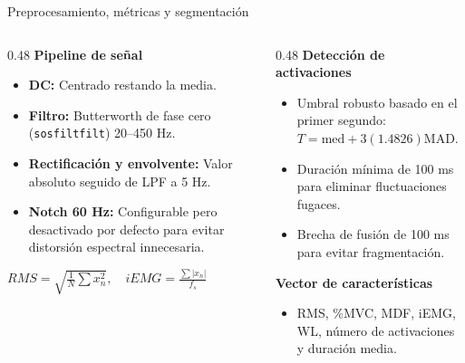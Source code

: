\documentclass[10pt, aspectratio=169]{beamer}
\begin{document}
\begin{frame}{Preprocesamiento, métricas y segmentación}
\fontsize{8.5pt}{10.5pt}\selectfont
\begin{columns}[t]
    \begin{column}{0.48\textwidth}
        \textbf{Pipeline de señal}
        \begin{itemize}
            \item \textbf{DC:} Centrado restando la media.
            \item \textbf{Filtro:} Butterworth de fase cero (\texttt{sosfiltfilt}) 20--450 Hz.
            \item \textbf{Rectificación y envolvente:} Valor absoluto seguido de LPF a 5 Hz.
            \item \textbf{Notch 60 Hz:} Configurable pero desactivado por defecto para evitar distorsión espectral innecesaria.
        \end{itemize}
        
        \vspace{0.1cm}
        \centering
        $RMS = \sqrt{\frac{1}{N}\sum x_n^2}, \quad iEMG = \frac{\sum |x_n|}{f_s}$
    \end{column}
    
    \begin{column}{0.48\textwidth}
        \textbf{Detección de activaciones}
        \begin{itemize}
            \item Umbral robusto basado en el primer segundo:
            $T = \text{med} + 3(1.4826)\text{MAD}$.
            \item Duración mínima de 100 ms para eliminar fluctuaciones fugaces.
            \item Brecha de fusión de 100 ms para evitar fragmentación.
        \end{itemize}
        
        \vspace{0.1cm}
        \textbf{Vector de características}
        \begin{itemize}
            \item RMS, \%MVC, MDF, iEMG, WL, número de activaciones y duración media.
        \end{itemize}
    \end{column}
\end{columns}
\end{frame}
\end{document}
